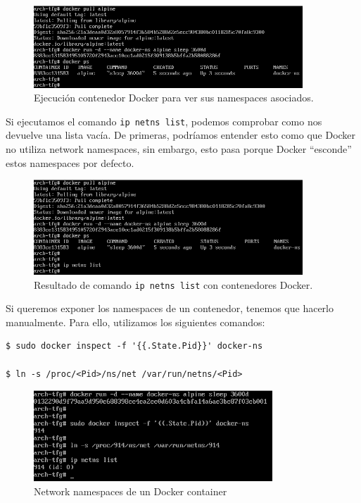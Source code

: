 \documentclass[a4paper, oneside, 12pt]{book}
\begin{document}
	\begin{figure}[h!]
		\begin{center}
			\includegraphics[width=0.9\textwidth]{img/docker_ns1.png}
			\caption{Ejecución contenedor Docker para ver sus namespaces asociados.}
		\end{center}
	\end{figure}

	\noindent Si ejecutamos el comando \texttt{ip netns list}, podemos comprobar como nos devuelve una lista vacía. De primeras, podríamos entender esto como que Docker no utiliza network namespaces, sin embargo, esto pasa porque Docker ``esconde'' estos namespaces por defecto.
	
	\begin{figure}[h!]
		\begin{center}
			\includegraphics[width=0.9\textwidth]{img/docker_ns2.png}
			\caption{Resultado de comando \texttt{ip netns list} con contenedores Docker.}
			\end{center}
	\end{figure}

	\pagebreak
	
	\noindent Si queremos exponer los namespaces de un contenedor, tenemos que hacerlo manualmente. Para ello, utilizamos los siguientes comandos:
	
	\begin{verbatim}
$ sudo docker inspect -f '{{.State.Pid}}' docker-ns

$ ln -s /proc/<Pid>/ns/net /var/run/netns/<Pid>
	\end{verbatim}

	\begin{figure}[h!]
		\begin{center}
			\includegraphics[width=0.8\textwidth]{img/docker_ns3.png}
			\caption{Network namespaces de un Docker container}
		\end{center}
	\end{figure}
\end{document}
